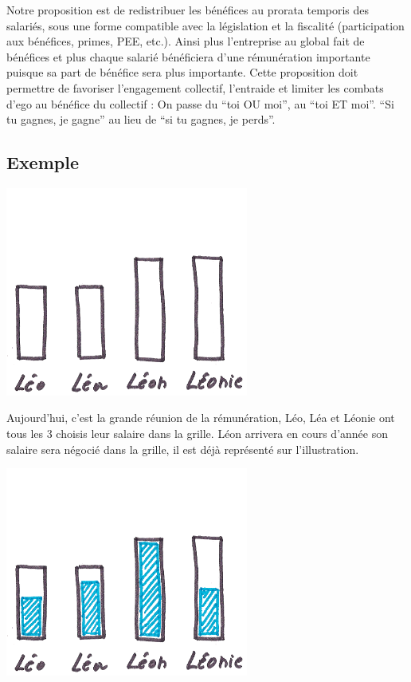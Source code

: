 \documentclass[12pt]{article}
\begin{document}
 Notre proposition est de redistribuer les bénéfices au prorata temporis des salariés, sous une forme compatible avec la législation et la fiscalité (participation aux bénéfices, primes, PEE, etc.).  Ainsi plus l'entreprise au global fait de bénéfices et plus chaque salarié bénéficiera d'une rémunération importante puisque sa part de bénéfice sera plus importante. Cette proposition doit permettre de favoriser l’engagement collectif, l’entraide et limiter les combats d’ego au bénéfice du collectif : On passe du “toi OU moi”, au “toi ET moi”. “Si tu gagnes, je gagne” au lieu de “si tu gagnes, je perds”.

\subsection{Exemple}

 \begin{center}
 \includegraphics[width=0.6\textwidth]{includes/choix_salaires}
 \end{center}

 Aujourd'hui, c'est la grande réunion de la rémunération, Léo, Léa et Léonie ont tous les 3 choisis leur salaire dans la grille. Léon arrivera en cours d’année son salaire sera négocié dans la grille, il est déjà représenté sur l'illustration.

 \begin{center}
 \includegraphics[width=0.6\textwidth]{includes/choix_part_fixe}
 \end{center}
\end{document}
